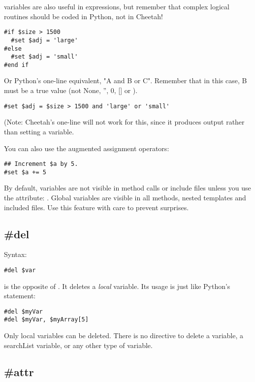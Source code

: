  variables are also useful in  expressions, but
remember that complex logical routines should be coded in Python, not in
Cheetah!
\begin{verbatim}
#if $size > 1500
  #set $adj = 'large'
#else
  #set $adj = 'small'
#end if
\end{verbatim}
Or Python's one-line equivalent, "A and B or C".  Remember that in this case,
B must be a true value (not None, '', 0, [] or {}).  
\begin{verbatim}
#set $adj = $size > 1500 and 'large' or 'small'
\end{verbatim}
(Note: Cheetah's one-line  will not work for this, since it
produces output rather than setting a variable.

You can also use the augmented assignment operators:
\begin{verbatim}
## Increment $a by 5.
#set $a += 5      
\end{verbatim}

By default,  variables are not visible in method calls or include
files unless you use the  attribute: .  Global variables are visible in all methods, nested templates and
included files.  Use this feature with care to prevent surprises.


\subsection{\#del}
\label{inheritanceEtc.del}

Syntax:
\begin{verbatim}
#del $var
\end{verbatim}

 is the opposite of .  It deletes a {\em local}
variable.  Its usage is just like Python's  statement:
\begin{verbatim}
#del $myVar
#del $myVar, $myArray[5]
\end{verbatim}

Only local variables can be deleted.  There is no directive to delete a
 variable, a searchList variable, or any other type of
variable.  

\subsection{\#attr}
\label{inheritanceEtc.attr}

